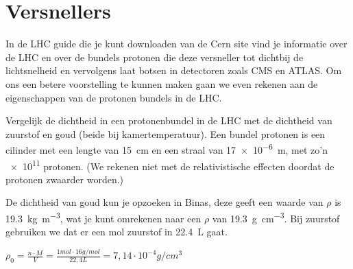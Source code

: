 \begin{questions}
\begin{figure}
{\begin{tikzpicture}
\end{tikzpicture}
}

\label{fig:Pion_feynman}
\end{figure}

\section{ Versnellers}

In de LHC guide die je kunt downloaden van de Cern site vind je
informatie over de LHC en over de bundels protonen die deze versneller
tot dichtbij de lichtsnelheid en vervolgens laat botsen in detectoren
zoals CMS en ATLAS. Om ons een betere voorstelling te kunnen maken gaan
we even rekenen aan de eigenschappen van de protonen bundels in de LHC.

\question
Vergelijk de dichtheid in een protonenbundel in de LHC met de dichtheid van zuurstof en goud 
(beide bij kamertemperatuur). Een bundel protonen is een cilinder met een lengte 
van \SI{15}{\centi\meter} en een straal van \SI{17e-6}{m}, met zo'n \SI{e11}{} protonen.
(We rekenen niet met de relativistische effecten doordat de protonen zwaarder worden.)
 

De dichtheid van goud kun je opzoeken in Binas, deze geeft een waarde van 
$\rho$ is \SI{19.3}{\kilogram\per\cubic\meter}, wat je kunt omrekenen naar
een $\rho$ van \SI{19.3}{\gram\per\cubic\centi\meter}. 
Bij zuurstof gebruiken we dat er een mol zuurstof in \SI{22.4}{\liter} gaat.

$\rho_0 = \frac{n \cdot M}{V} = \frac {1 mol \cdot 16 g/mol}{22,4 L} = 7,14 \cdot 10^{-4} g/cm^{3} $


\end{questions}
